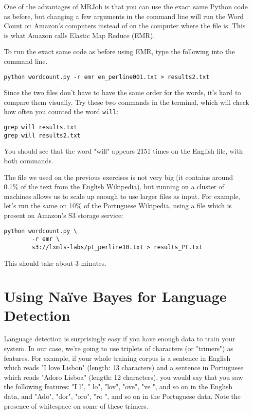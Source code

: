 One of the advantages of MRJob is that you can use the exact same Python code
as before, but changing a few arguments in the command line will run the Word
Count on Amazon's computers instead of on the computer where the file is. This
is what Amazon calls Elastic Map Reduce (EMR).

To run the exact same code as before using EMR, type the following into the command line.

\begin{verbatim}
python wordcount.py -r emr en_perline001.txt > results2.txt
\end{verbatim}

Since the two files don't have to have the same order for the words, it's hard to compare them visually. Try these two commands in the terminal, which will check how often you counted the word \texttt{will}:

\begin{verbatim}
grep will results.txt
grep will results2.txt
\end{verbatim}

You should see that the word "will" appears 2151 times on the English file, with both commands.

The file we used on the previous exercises is not very big (it contains around 0.1\% of the text from the English Wikipedia), but running on a cluster of machines allows us to
scale up enough to use larger files as input. For example, let's run the same on 10\% of the Portuguese Wikipedia, using a file which is present on Amazon's S3 storage service:

\begin{verbatim}
python wordcount.py \
        -r emr \
        s3://lxmls-labs/pt_perline10.txt > results_PT.txt
\end{verbatim}

This should take about 3 minutes.

\section{Using Na\"{i}ve Bayes for Language Detection}

Language detection is surprisingly easy if you have enough data to train your system. In our case, we're going to use triplets of characters (or "trimers") as features. For example, if your whole training corpus is a sentence in English which reads "I love Lisbon" (length: 13 characters) and a sentence in Portuguese which reads "Adoro Lisboa" (length: 12 characters), you would say that you saw the following features: "I l", " lo", "lov", "ove", "ve ", and so on in the English data, and "Ado", "dor", "oro", "ro ", and so on in the Portuguese data. Note the presence of whitespace on some of these trimers.

